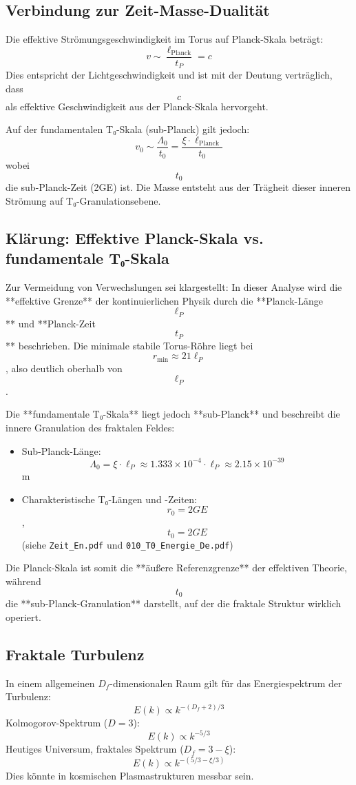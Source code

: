 	\subsection{Verbindung zur Zeit-Masse-Dualität}
	Die effektive Strömungsgeschwindigkeit im Torus auf Planck-Skala beträgt:
	$$   
	v \sim \frac{\ell_{\text{Planck}}}{t_P} = c
	$$
	Dies entspricht der Lichtgeschwindigkeit und ist mit der Deutung verträglich, dass $$   c   $$ als effektive Geschwindigkeit aus der Planck-Skala hervorgeht.
	
	Auf der fundamentalen T₀-Skala (sub-Planck) gilt jedoch:
	$$   
	v_0 \sim \frac{\Lambda_0}{t_0} = \frac{\xi \cdot \ell_{\text{Planck}}}{t_0}
	$$
	wobei $$   t_0   $$ die sub-Planck-Zeit (2GE) ist. Die Masse entsteht aus der Trägheit dieser inneren Strömung auf T₀-Granulationsebene.
	
	\subsection{Klärung: Effektive Planck-Skala vs. fundamentale T₀-Skala}
	Zur Vermeidung von Verwechslungen sei klargestellt: In dieser Analyse wird die **effektive Grenze** der kontinuierlichen Physik durch die **Planck-Länge $$   \ell_P   $$** und **Planck-Zeit $$   t_P   $$** beschrieben. Die minimale stabile Torus-Röhre liegt bei $$   r_{\min} \approx 21 \ell_P   $$, also deutlich oberhalb von $$   \ell_P   $$.
	
	Die **fundamentale T₀-Skala** liegt jedoch **sub-Planck** und beschreibt die innere Granulation des fraktalen Feldes:
	\begin{itemize}
		\item Sub-Planck-Länge: $$   \Lambda_0 = \xi \cdot \ell_P \approx 1.333 \times 10^{-4} \cdot \ell_P \approx 2.15 \times 10^{-39}   $$ m
		\item Charakteristische T₀-Längen und -Zeiten: $$   r_0 = 2GE   $$, $$   t_0 = 2GE   $$ (siehe \texttt{Zeit\_En.pdf} und \texttt{010\_T0\_Energie\_De.pdf})
	\end{itemize}
	
	Die Planck-Skala ist somit die **äußere Referenzgrenze** der effektiven Theorie, während $$   t_0   $$ die **sub-Planck-Granulation** darstellt, auf der die fraktale Struktur wirklich operiert.
	
	\subsection{Fraktale Turbulenz}
	In einem allgemeinen \(D_f\)-dimensionalen Raum gilt für das Energiespektrum der Turbulenz:
	\[
	E(k) \propto k^{-(D_f + 2)/3}
	\]
	Kolmogorov-Spektrum (\( D = 3 \)):
	\[
	E(k) \propto k^{-5/3}
	\]
	Heutiges Universum, fraktales Spektrum (\( D_f = 3 - \xi \)):
	\[
	E(k) \propto k^{-(5/3 - \xi/3)}
	\]
	Dies könnte in kosmischen Plasmastrukturen messbar sein.

